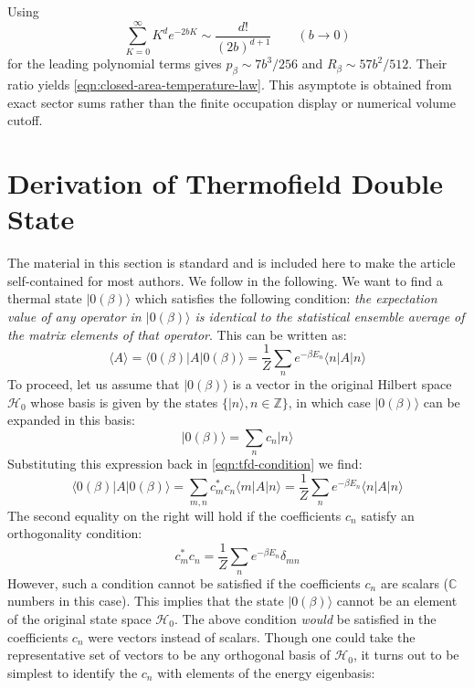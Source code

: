 \documentclass[twocolumn,draft,aps,nofootinbib,nobibnotes,final]{revtex4-2}
\newcommand{\C}{\mathbb{C}}
\newcommand{\mc}[1]{\mathcal{#1}}
\newcommand{\mbb}[1]{\mathbb{#1}}
\newcommand{\expect}[1]{\langle #1\rangle}
\newcommand{\expectop}[3]{\langle #1 \vert #2 \vert #3 \rangle}
\newcommand{\ket}[1]{\vert #1 \rangle}
\begin{document}
Using
\begin{equation}
 \sum_{K=0}^{\infty}K^d e^{-2bK}
 \sim\frac{d!}{(2b)^{d+1}}\qquad(b\to0)
\end{equation}
for the leading polynomial terms gives $p_\beta\sim7b^3/256$ and $R_\beta\sim57b^2/512$. Their ratio yields \eqref{eqn:closed-area-temperature-law}. This asymptote is obtained from exact sector sums rather than the finite occupation display or numerical volume cutoff.



\section{Derivation of Thermofield Double State}\label{sec:tfd}

The material in this section is standard and is included here to make the article self-contained for most authors. We follow \cite[Sec 5.1]{Khanna2009Thermal} in the following. We want to find a thermal state $ \ket{0(\beta)} $ which satisfies the following condition: \textit{the expectation value of any operator in $ \ket{0(\beta)} $ is identical to the statistical ensemble average of the matrix elements of that operator}. This can be written as:
\begin{equation}\label{eqn:tfd-condition}
	\expect{A} = \expectop{0(\beta)}{A}{0(\beta)} = \frac{1}{Z} \sum_n e^{-\beta E_n} \expectop{n}{A}{n}
\end{equation}
To proceed, let us assume that $ \ket{0(\beta)} $ is a vector in the original Hilbert space $ \mc{H}_0 $ whose basis is given by the states $ \{ \ket{n}, n \in \mbb{Z} \} $, in which case $ \ket{0(\beta)} $ can be expanded in this basis:
\begin{equation}\label{eqn:tfd-expansion}
	\ket{0(\beta)} = \sum_n c_n \ket{n} \nonumber
\end{equation}
Substituting this expression back in \eqref{eqn:tfd-condition} we find:
\begin{equation}
	\expectop{0(\beta)}{A}{0(\beta)} = \sum_{m,n} c^*_m c_n \expectop{m}{A}{n} = \frac{1}{Z} \sum_n e^{-\beta E_n} \expectop{n}{A}{n} \nonumber
\end{equation}
The second equality on the right will hold if the coefficients $ c_n $ satisfy an orthogonality condition:
\begin{equation}\label{eqn:ortho-condition}
	c^*_m c_n = \frac{1}{Z} \sum_n e^{-\beta E_n} \delta_{mn}
\end{equation}
However, such a condition cannot be satisfied if the coefficients $ c_n $ are scalars ($ \C $ numbers in this case). This implies that the state $ \ket{0(\beta)} $ cannot be an element of the original state space $ \mc{H}_0 $. The above condition \textit{would} be satisfied in the coefficients $ c_n $ were vectors instead of scalars. Though one could take the representative set of vectors to be any orthogonal basis of $ \mc{H}_0 $, it turns out to be simplest to identify the $ c_n $ with elements of the energy eigenbasis:
\end{document}
